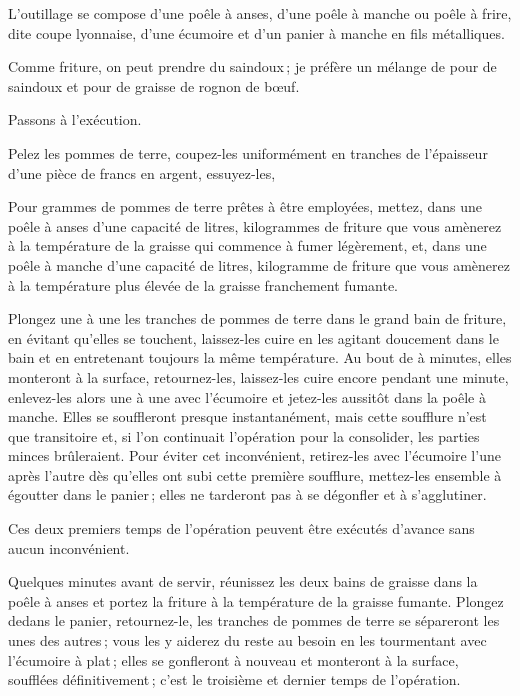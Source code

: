 L'outillage se compose d'une poêle à anses, d'une poêle à manche ou poêle
à frire, dite coupe lyonnaise, d'une écumoire et d'un panier à manche en fils
métalliques.

Comme friture, on peut prendre du saindoux ; je préfère un mélange de
{\mmm} pour {\mmm} de saindoux et {\mmm} pour {\mmm}
de graisse de rognon de bœuf.

Passons à l'exécution.

Pelez les pommes de terre, coupez-les uniformément en tranches de l'épaisseur
d'une pièce de {\mmm} francs en argent, essuyez-les,

Pour {\mmm} grammes de pommes de terre prêtes à être employées, mettez,
dans une poêle à anses d'une capacité de {\mmm} litres, {\mmm}
kilogrammes de friture que vous amènerez à la température de la graisse qui
commence à fumer légèrement, et, dans une poêle à manche d'une capacité de
{\mmm} litres, {\mmm} kilogramme de friture que vous amènerez à la
température plus élevée de la graisse franchement fumante.

Plongez une à une les tranches de pommes de terre dans le grand bain de
friture, en évitant qu'elles se touchent, laissez-les cuire en les agitant
doucement dans le bain et en entretenant toujours la même température. Au bout
de {\mmm} à {\mmm} minutes, elles monteront à la surface,
retournez-les, laissez-les cuire encore pendant une minute, enlevez-les alors
une à une avec l'écumoire et jetez-les aussitôt dans la poêle à manche. Elles
se souffleront presque instantanément, mais cette soufflure n'est que
transitoire et, si l'on continuait l'opération pour la consolider, les parties
minces brûleraient. Pour éviter cet inconvénient, retirez-les avec l'écumoire
l'une après l'autre dès qu'elles ont subi cette première soufflure, mettez-les
ensemble à égoutter dans le panier ; elles ne tarderont pas à se dégonfler et
à s'agglutiner.

Ces deux premiers temps de l'opération peuvent être exécutés d'avance sans
aucun inconvénient.

Quelques minutes avant de servir, réunissez les deux bains de graisse dans la
poêle à anses et portez la friture à la température de la graisse fumante.
Plongez dedans le panier, retournez-le, les tranches de pommes de terre se
sépareront les unes des autres ; vous les y aiderez du reste au besoin en les
tourmentant avec l'écumoire à plat ; elles se gonfleront à nouveau et monteront
à la surface, soufflées définitivement ; c'est le troisième et dernier temps de
l'opération.

